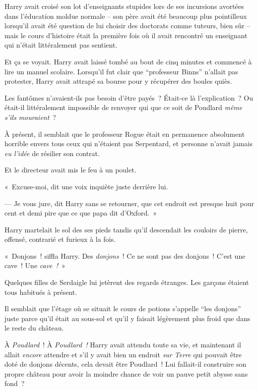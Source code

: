 Harry avait croisé son lot d'enseignants stupides lors de ses incursions avortées dans l'éducation moldue normale -- son père avait été beaucoup plus pointilleux lorsqu'il avait été question de lui choisir des doctorats comme tuteurs, bien sûr -- mais le cours d'histoire était la première fois où il avait rencontré un enseignant qui n'était littéralement pas sentient.

Et ça se voyait.
Harry avait laissé tombé au bout de cinq minutes et commencé à lire un manuel scolaire.
Lorsqu'il fut clair que “professeur Binns” n'allait pas protester, Harry avait attrapé sa bourse pour y récupérer des boules quiès.

Les fantômes n'avaient-ils pas besoin d'être payés~?
Était-ce là l'explication~?
Ou était-il littéralement impossible de renvoyer qui que ce soit de Poudlard \emph{même s'ils mouraient}~?

À présent, il semblait que le professeur Rogue était en permanence absolument horrible envers tous ceux qui n'étaient pas Serpentard, et personne n'avait jamais \emph{eu l'idée} de résilier son contrat.

Et le directeur avait mis le feu à un poulet.

«~Excuse-moi, dit une voix inquiète juste derrière lui.

--- Je vous jure, dit Harry sans se retourner, que cet endroit est presque huit pour cent et demi pire que ce que papa dit d'Oxford.~»

\later

Harry martelait le sol des ses pieds tandis qu'il descendait les couloirs de pierre, offensé, contrarié et furieux à la fois.

«~Donjons~! siffla Harry.
Des \emph{donjons}~!
Ce ne sont pas des donjons~!
C'est une cave~!
Une \emph{cave~!}~»

Quelques filles de Serdaigle lui jetèrent des regards étranges.
Les garçons étaient tous habitués à présent.

Il semblait que l'étage où se situait le cours de potions s'appelle “les donjons” juste parce qu'il était au sous-sol et qu'il y faisait légèrement plus froid que dans le reste du château.

À \emph{Poudlard}~!
À \emph{Poudlard~!} Harry avait attendu toute sa vie, et maintenant il allait \emph{encore} attendre et s'il y avait bien un endroit \emph{sur Terre} qui pouvait être doté de donjons décents, cela devait être Poudlard~!
Lui fallait-il construire son propre château pour avoir la moindre chance de voir un pauve petit abysse sans fond~?

